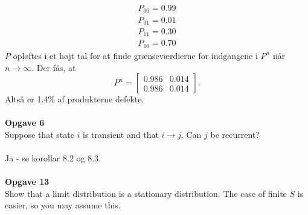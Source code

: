 \documentclass[12pt,a4paper,draft]{report}
\begin{document}
\begin{align*}
P_{00}=0.99\\
P_{01}=0.01\\
P_{11}=0.30\\
P_{10}=0.70
\end{align*}
$P$ opløftes i et højt tal for at finde grænseværdierne for indgangene i $P^n$ når $n\to\infty$. Der fås, at
\begin{equation}
P^n=\begin{bmatrix}
0.986 & 0.014\\
0.986 & 0.014
\end{bmatrix}.
\end{equation}
Altså er 1.4\% af produkterne defekte.\\\\
\textbf{Opgave 6}\\
Suppose that state $i$ is transient and that $i\to j$. Can $j$ be recurrent?\\\\
Ja - se korollar 8.2 og 8.3.\\\\
\textbf{Opgave 13}\\
Show that a limit distribution is a stationary distribution. The case of finite $S$ is easier, so you may assume this.
\end{document}
